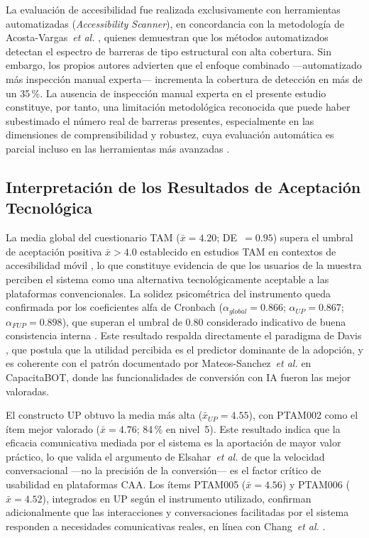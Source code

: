 \documentclass[journal]{IEEEtran}
\begin{document}
	La evaluaci\'on de accesibilidad fue realizada exclusivamente con herramientas automatizadas (\textit{Accessibility Scanner}), en concordancia con la metodolog\'ia de Acosta-Vargas~\textit{et al.} \cite{acosta2021}, quienes demuestran que los m\'etodos automatizados detectan el espectro de barreras de tipo estructural con alta cobertura. Sin embargo, los propios autores advierten que el enfoque combinado ---automatizado m\'as inspecci\'on manual experta--- incrementa la cobertura de detecci\'on en m\'as de un 35\,\%. La ausencia de inspecci\'on manual experta en el presente estudio constituye, por tanto, una limitaci\'on metodol\'ogica reconocida que puede haber subestimado el n\'umero real de barreras presentes, especialmente en las dimensiones de comprensibilidad y robustez, cuya evaluaci\'on autom\'atica es parcial incluso en las herramientas m\'as avanzadas \cite{ara2024}.
	
	\subsection{Interpretaci\'on de los Resultados de Aceptaci\'on Tecnol\'ogica}
	La media global del cuestionario TAM ($\bar{x}=4.20$; DE~$=0.95$) supera el umbral de aceptaci\'on positiva $\bar{x} > 4.0$ establecido en estudios TAM en contextos de accesibilidad m\'ovil \cite{julianto2023}, lo que constituye evidencia de que los usuarios de la muestra perciben el sistema como una alternativa tecnol\'ogicamente aceptable a las plataformas convencionales. La solidez psicom\'etrica del instrumento queda confirmada por los coeficientes alfa de Cronbach ($\alpha_{global}=0.866$; $\alpha_{UP}=0.867$; $\alpha_{FUP}=0.898$), que superan el umbral de 0.80 considerado indicativo de buena consistencia interna \cite{nunnally1978}. Este resultado respalda directamente el paradigma de Davis \cite{davis1989}, que postula que la utilidad percibida es el predictor dominante de la adopci\'on, y es coherente con el patr\'on documentado por Mateos-Sanchez~\textit{et al.} \cite{mateos2022} en CapacitaBOT, donde las funcionalidades de conversi\'on con IA fueron las mejor valoradas.
	
	El constructo UP obtuvo la media m\'as alta ($\bar{x}_{UP}=4.55$), con PTAM002 como el \'item mejor valorado ($\bar{x}=4.76$; 84\,\% en nivel~5). Este resultado indica que la eficacia comunicativa mediada por el sistema es la aportaci\'on de mayor valor pr\'actico, lo que valida el argumento de Elsahar~\textit{et al.} \cite{elsahar2019} de que la velocidad conversacional ---no la precisi\'on de la conversi\'on--- es el factor cr\'itico de usabilidad en plataformas CAA. Los \'items PTAM005 ($\bar{x}=4.56$) y PTAM006 ($\bar{x}=4.52$), integrados en UP seg\'un el instrumento utilizado, confirman adicionalmente que las interacciones y conversaciones facilitadas por el sistema responden a necesidades comunicativas reales, en l\'inea con Chang~\textit{et al.} \cite{chang2022}.
	
\end{document}

